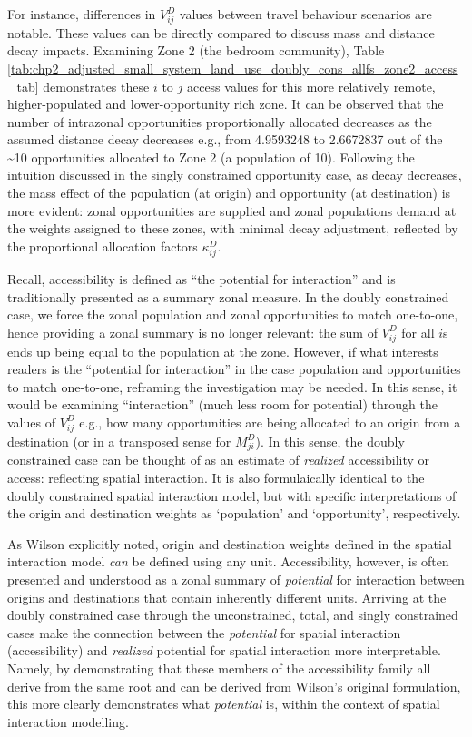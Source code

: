 \documentclass[
11pt, %
oneside, %
english, %
singlespacing, %
]{macthesis} %
\begin{document}
For instance, differences in \(V_{ij}^D\) values between travel behaviour scenarios are notable. These values can be directly compared to discuss mass and distance decay impacts. Examining Zone 2 (the bedroom community), Table \ref{tab:chp2_adjusted_small_system_land_use_doubly_cons_allfs_zone2_access_tab} demonstrates these \(i\) to \(j\) access values for this more relatively remote, higher-populated and lower-opportunity rich zone. It can be observed that the number of intrazonal opportunities proportionally allocated decreases as the assumed distance decay decreases e.g., from 4.9593248 to 2.6672837 out of the \textasciitilde10 opportunities allocated to Zone 2 (a population of 10). Following the intuition discussed in the singly constrained opportunity case, as decay decreases, the mass effect of the population (at origin) and opportunity (at destination) is more evident: zonal opportunities are supplied and zonal populations demand at the weights assigned to these zones, with minimal decay adjustment, reflected by the proportional allocation factors \(\kappa_{ij}^D\).



Recall, accessibility is defined as ``the potential for interaction'' and is traditionally presented as a summary zonal measure. In the doubly constrained case, we force the zonal population and zonal opportunities to match one-to-one, hence providing a zonal summary is no longer relevant: the sum of \(V_{ij}^D\) for all \(i\)s ends up being equal to the population at the zone. However, if what interests readers is the ``potential for interaction'' in the case population and opportunities to match one-to-one, reframing the investigation may be needed. In this sense, it would be examining ``interaction'' (much less room for potential) through the values of \(V_{ij}^D\) e.g., how many opportunities are being allocated to an origin from a destination (or in a transposed sense for \(M_{ji}^D\)). In this sense, the doubly constrained case can be thought of as an estimate of \emph{realized} accessibility or access: reflecting spatial interaction. It is also formulaically identical to the doubly constrained spatial interaction model, but with specific interpretations of the origin and destination weights as `population' and `opportunity', respectively.

As Wilson explicitly noted, origin and destination weights defined in the spatial interaction model \emph{can} be defined using any unit. Accessibility, however, is often presented and understood as a zonal summary of \emph{potential} for interaction between origins and destinations that contain inherently different units. Arriving at the doubly constrained case through the unconstrained, total, and singly constrained cases make the connection between the \emph{potential} for spatial interaction (accessibility) and \emph{realized} potential for spatial interaction more interpretable. Namely, by demonstrating that these members of the accessibility family all derive from the same root and can be derived from Wilson's original formulation, this more clearly demonstrates what \emph{potential} is, within the context of spatial interaction modelling.
\end{document}
